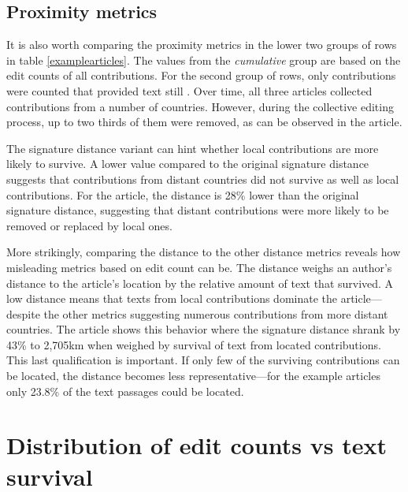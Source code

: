 \subsection{Proximity metrics}

It is also worth comparing the proximity metrics in the lower two groups of rows in table \ref{examplearticles}.
The values from the \emph{cumulative} group are based on the edit counts of all contributions.
For the second group of rows, only contributions were counted that provided text still .
Over time, all three articles collected contributions from a number of countries. 
However, during the collective editing process, up to two thirds of them were removed, as can be observed in the  article. 

The signature distance variant  can hint whether local contributions are more likely to survive.
A lower  value compared to the original signature distance suggests that contributions from distant countries did not survive as well as local contributions.
For the  article, the  distance is 28\% lower than  the original signature distance, suggesting that distant contributions were more likely to be removed or replaced by local ones.

More strikingly, comparing the  distance to the other distance metrics reveals how misleading metrics based on edit count can be.
The  distance weighs an author's distance to the article's location by the relative amount of text that survived.
A low  distance means that texts from local contributions dominate the article---despite the other metrics suggesting numerous contributions from more distant countries.
The  article shows this behavior where the signature distance shrank by 43\% to 2,705km when weighed by survival of text from located contributions. 
This last qualification is important.
If only few of the surviving contributions can be located, the  distance becomes less representative---for the example articles only 23.8\% of the text passages could be located.


\section{Distribution of edit counts vs text survival}\label{sec:editcountvstextsurvival}

